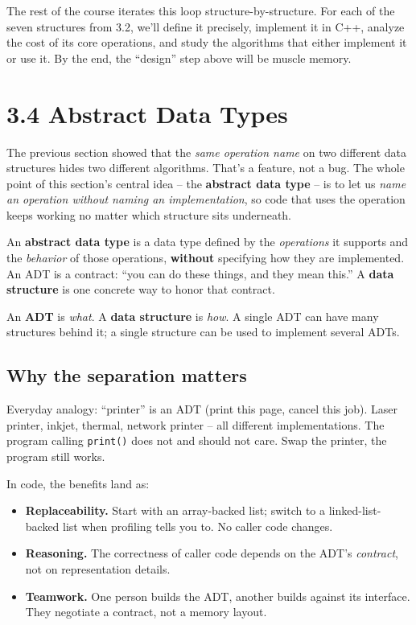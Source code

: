 \documentclass[11pt]{article}
\begin{document}
\begin{notebox}
The rest of the course iterates this loop structure-by-structure. For
each of the seven structures from 3.2, we'll define it precisely,
implement it in C++, analyze the cost of its core operations, and
study the algorithms that either implement it or use it. By the end,
the ``design'' step above will be muscle memory.
\end{notebox}

\section{3.4 Abstract Data Types}

The previous section showed that the \emph{same operation name} on
two different data structures hides two different algorithms. That's
a feature, not a bug. The whole point of this section's central idea
-- the \textbf{abstract data type} -- is to let us \emph{name an
operation without naming an implementation}, so code that uses the
operation keeps working no matter which structure sits underneath.

\begin{defnbox}
An \textbf{abstract data type} is a data type defined by the
\emph{operations} it supports and the \emph{behavior} of those
operations, \textbf{without} specifying how they are implemented.
An ADT is a contract: ``you can do these things, and they mean this.''
A \textbf{data structure} is one concrete way to honor that contract.
\end{defnbox}

\begin{ideabox}
An \textbf{ADT} is \emph{what}. A \textbf{data structure} is
\emph{how}. A single ADT can have many structures behind it; a single
structure can be used to implement several ADTs.
\end{ideabox}

\subsection{Why the separation matters}

Everyday analogy: ``printer'' is an ADT (print this page, cancel this
job). Laser printer, inkjet, thermal, network printer -- all different
implementations. The program calling \texttt{print()} does not and
should not care. Swap the printer, the program still works.

In code, the benefits land as:
\begin{itemize}[leftmargin=*]
  \item \textbf{Replaceability.} Start with an array-backed list;
        switch to a linked-list-backed list when profiling tells you
        to. No caller code changes.
  \item \textbf{Reasoning.} The correctness of caller code depends on
        the ADT's \emph{contract}, not on representation details.
  \item \textbf{Teamwork.} One person builds the ADT, another builds
        against its interface. They negotiate a contract, not a
        memory layout.
\end{itemize}
\end{document}
